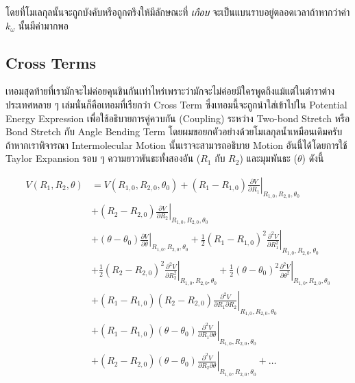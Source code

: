 \noindent โดยที่โมเลกุลนั้นจะถูกบังคับหรือถูกตรึงให้มีลักษณะที่ \textit{เกือบ} จะเป็นแบนราบอยู่ตลอดเวลาถ้าหากว่าค่า $k_{\omega}$
นั้นมีค่ามากพอ

\subsection{Cross Terms}

เทอมสุดท้ายที่เรามักจะไม่ค่อยคุนชินกันเท่าไหร่เพราะว่ามักจะไม่ค่อยมีใครพูดถึงแม้แต่ในตำราต่างประเทศหลาย ๆ เล่มนั่นก็คือเทอมที่เรียกว่า Cross Term
ซึ่งเทอมนี้จะถูกนำใส่เข้าไปใน Potential Energy Expression เพื่อใช้อธิบายการคู่ควบกัน (Coupling) ระหว่าง Two-bond Stretch
หรือ Bond Stretch กับ Angle Bending Term โดยผมขอยกตัวอย่างด้วยโมเลกุลน้ำเหมือนเดิมครับ ถ้าหากเราพิจารณา Intermolecular Motion
นั้นเราจะสามารถอธิบาย Motion อันนี้ได้โดยการใช้ Taylor Expansion รอบ ๆ ความยาวพันธะทั้งสองอัน ($R_{1}$ กับ $R_{2}$) และมุมพันธะ
($\theta$) ดังนี้

\begin{align}
    V\left(R_1, R_2, \theta\right)
     & =
    V\left(R_{1,0}, R_{2,0}, \theta_0\right)
    + \left.\left(R_1-R_{1,0}\right) \frac{\partial V}{\partial R_1}\right|_{R_{1,0}, R_{2,0}, \theta_0} \nonumber    \\
     & + \left.\left(R_2-R_{2,0}\right) \frac{\partial V}{\partial R_2}\right|_{R_{1,0}, R_{2,0}, \theta_0} \nonumber \\
     & + \left.\left(\theta-\theta_0\right) \frac{\partial V}{\partial \theta}\right|_{R_{1,0}, R_{2,0}, \theta_0}
    + \left.\frac{1}{2}\left(R_1-R_{1,0}\right)^2
    \frac{\partial^2 V}{\partial R_1^2}\right|_{R_{1,0}, R_{2,0}, \theta_0} \nonumber                                 \\
     & + \left.\frac{1}{2}\left(R_2-R_{2,0}\right)^2
    \frac{\partial^2 V}{\partial R_2^2}\right|_{R_{1,0}, R_{2,0}, \theta_0}
    + \left.\frac{1}{2}\left(\theta-\theta_0\right)^2
    \frac{\partial^2 V}{\partial \theta^2}\right|_{R_{1,0}, R_{2,0}, \theta_0} \nonumber                                       \\
     & + \left.\left(R_1-R_{1,0}\right)\left(R_2-R_{2,0}\right)
    \frac{\partial^2 V}{\partial R_1 \partial R_2}\right|_{R_{1,0}, R_{2,0}, \theta_0} \nonumber                      \\
     & + \left.\left(R_1-R_{1,0}\right)\left(\theta-\theta_0\right)
    \frac{\partial^2 V}{\partial R_1 \partial \theta}\right|_{R_{1,0}, R_{2,0}, \theta_0} \nonumber                   \\
     & + \left.\left(R_2-R_{2,0}\right)\left(\theta-\theta_0\right)
    \frac{\partial^2 V}{\partial R_2 \partial \theta}\right|_{R_{1,0}, R_{2,0}, \theta_0} + \ldots
\end{align}

